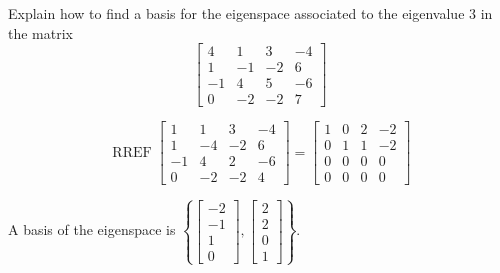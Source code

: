 
\begin{exerciseStatement}


Explain how to find a basis for the eigenspace associated to the eigenvalue \( 3 \) in the matrix \[ \left[\begin{array}{cccc}
4 & 1 & 3 & -4 \\
1 & -1 & -2 & 6 \\
-1 & 4 & 5 & -6 \\
0 & -2 & -2 & 7
\end{array}\right] \]


\end{exerciseStatement}
    
\begin{exerciseAnswer} 


\[\operatorname{RREF} \left[\begin{array}{cccc}
1 & 1 & 3 & -4 \\
1 & -4 & -2 & 6 \\
-1 & 4 & 2 & -6 \\
0 & -2 & -2 & 4
\end{array}\right] = \left[\begin{array}{cccc}
1 & 0 & 2 & -2 \\
0 & 1 & 1 & -2 \\
0 & 0 & 0 & 0 \\
0 & 0 & 0 & 0
\end{array}\right] \]



A basis of the eigenspace is \( \left\{ \left[\begin{array}{c}
-2 \\
-1 \\
1 \\
0
\end{array}\right] , \left[\begin{array}{c}
2 \\
2 \\
0 \\
1
\end{array}\right] \right\} \).


\end{exerciseAnswer}
    
